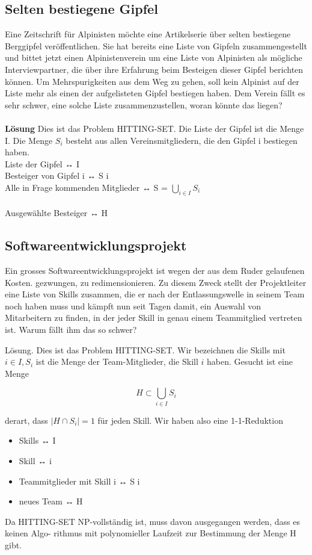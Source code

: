 \subsection{Selten bestiegene Gipfel}
Eine Zeitschrift für Alpinisten möchte eine Artikelserie über selten bestiegene Berggipfel veröffentlichen. Sie hat bereits eine Liste von Gipfeln zusammengestellt und bittet jetzt einen Alpinistenverein um eine Liste von Alpinisten als mögliche Interviewpartner, die über ihre Erfahrung beim Besteigen dieser Gipfel berichten können. Um Mehrspurigkeiten aus dem Weg zu gehen, soll kein Alpinist auf der Liste mehr als einen der aufgelisteten Gipfel bestiegen haben. Dem Verein fällt es sehr schwer, eine solche Liste zusammenzustellen, woran könnte das liegen?\\
\\
\textbf{Lösung}
Dies ist das Problem HITTING-SET. Die Liste der Gipfel ist die Menge I. Die Menge $S_i$ besteht aus allen Vereinsmitgliedern, die den Gipfel i bestiegen haben.\\
Liste der Gipfel ↔ I\\
Besteiger von Gipfel i ↔ S i\\
Alle in Frage kommenden Mitglieder ↔ S = $\bigcup_{i \in I} S_i$\\
\\
Ausgewählte Besteiger ↔ H

\subsection{Softwareentwicklungsprojekt}

Ein grosses Softwareentwicklungsprojekt ist wegen der aus dem Ruder gelaufenen Kosten.
gezwungen, zu redimensionieren. Zu diesem Zweck stellt der Projektleiter eine Liste von Skills
zusammen, die er nach der Entlassungswelle in seinem Team noch haben muss und kämpft nun
seit Tagen damit, ein Auswahl von Mitarbeitern zu finden, in der jeder Skill in genau einem
Teammitglied vertreten ist. Warum fällt ihm das so schwer?

Lösung. Dies ist das Problem HITTING-SET. Wir bezeichnen die Skills mit $i \in I, S_i$ ist die
Menge der Team-Mitglieder, die Skill $i$ haben. Gesucht ist eine Menge

$$H \subset \bigcup_{i\in I}S_i$$

derart, dass $|H \cap S_i| = 1$ für jeden Skill. Wir haben also eine 1-1-Reduktion

\begin{itemize}
\item Skills ↔ I
\item Skill ↔ i
\item Teammitglieder mit Skill i ↔ S i
\item neues Team ↔ H
\end{itemize}

Da HITTING-SET NP-vollständig ist, muss davon ausgegangen werden, dass es keinen Algo-
rithmus mit polynomieller Laufzeit zur Bestimmung der Menge H gibt. 